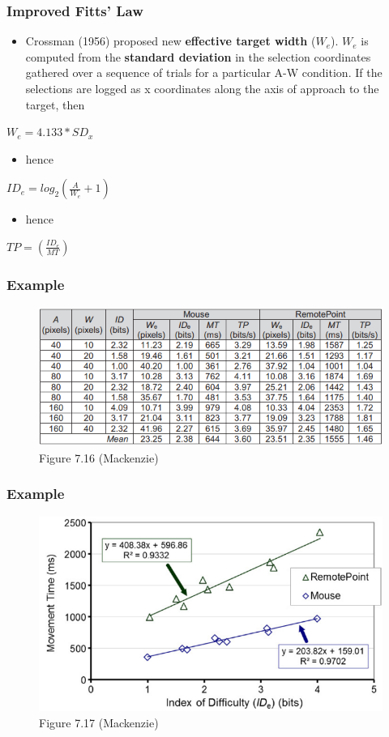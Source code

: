 \documentclass{beamer}
\begin{document}
\begin{frame}
	\frametitle{Improved Fitts' Law}
	\begin{itemize}
		\item Crossman (1956) proposed new \textbf{effective target width} ($W_e$).  $W_e$ is computed from the \textbf{standard deviation} in the selection coordinates gathered over a sequence of trials for a particular A-W condition.   If the selections are logged as x coordinates along the axis of approach to the target, then %
	\end{itemize}
	\centering
	$W_{e} = 4.133 * SD_{x}$
	\begin{itemize}
		\item hence
	\end{itemize}
	\centering
	$ID_e = log_{2}\left ( \frac{A}{W_e} + 1 \right )$
	\begin{itemize}
		\item hence
	\end{itemize}
	\centering
	$TP = \left ( \frac{ID_{e}}{MT} \right )$
\end{frame}

\begin{frame}
	\frametitle{Example}
	\begin{figure}
		\includegraphics[width=1\linewidth]{image/7-16}
		\caption{Figure 7.16 (Mackenzie)}
	\end{figure}
\end{frame}

\begin{frame}
	\frametitle{Example}
	\begin{figure}
		\includegraphics[width=0.8\linewidth]{image/7-17}
		\caption{Figure 7.17 (Mackenzie)}
	\end{figure}
\end{frame}
\end{document}
